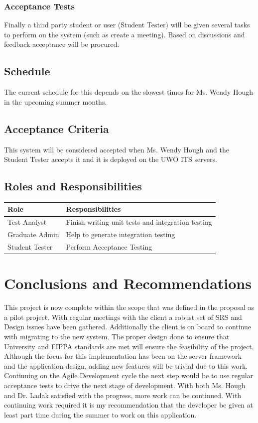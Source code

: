 \documentclass{journal}
\begin{document}
\subsubsection{Acceptance Tests}
Finally a third party student or user (Student Tester)  will be given several tasks to perform on the system (such as create a meeting). Based on discussions and feedback acceptance will be procured. 

\subsection{Schedule}
The current schedule for this depends on the slowest times for Ms. Wendy Hough in the upcoming summer months.  

\subsection{Acceptance Criteria}
This system will be considered accepted when Ms. Wendy Hough and the Student Tester accepts it and it is deployed on the UWO ITS servers.

\subsection{Roles and Responsibilities}

\begin{tabular}{ | l | p{7cm} |}
\hline 
Role & Responsibilities \\
\hline
 Test Analyst & Finish writing unit tests and integration testing \\
 Graduate Admin & Help to generate integration testing \\
 Student Tester & Perform Acceptance Testing \\
\hline
\end{tabular}

\section{Conclusions and Recommendations}

This project is now complete within the scope that was defined in the proposal as a pilot project. With regular meetings with the client a robust set of SRS and Design issues have been gathered. Additionally the client is on board to continue with migrating to the new system. The proper design done to ensure that University and FIPPA standards are met will ensure the feasibility of the project. Although the focus for this implementation has been on the server framework and the application design, adding new features will be trivial due to this work. Continuing on the Agile Development cycle the next step would be to use regular acceptance tests to drive the next stage of development. With both Ms. Hough and Dr. Ladak satisfied with the progress, more work can be continued. With continuing work required it is my recommendation that the developer be given at least part time during the summer to work on this application. 
\end{document}
